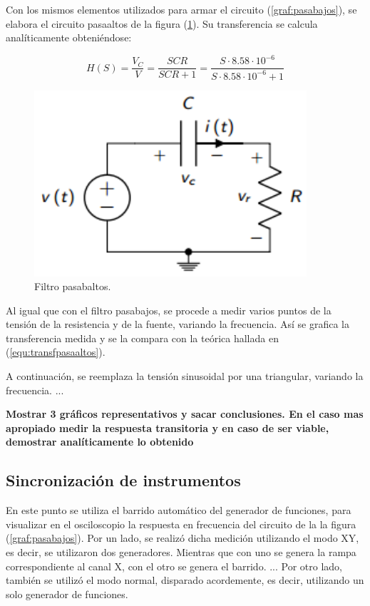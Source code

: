 \documentclass[a4paper]{article}
\begin{document}
Con los mismos elementos utilizados para armar el circuito (\ref{graf:pasabajos}), se elabora el circuito pasaaltos de la figura (\ref{graf:pasaaltos}). Su transferencia se calcula analíticamente obteniéndose:

\begin{equation}
	H \left(S \right) = \frac{V_C}{V} = \frac{SCR}{SCR + 1} = \frac{S \cdot 8.58 \cdot 10^{-6}}{S \cdot 8.58 \cdot 10^{-6} + 1}
	\label{equ:transfpasaaltos}
\end{equation}

\begin{figure}[H]
	\centering
	\includegraphics[width=0.9\textwidth]{Filtro-pasaaltos.PNG}
	\caption{Filtro pasabaltos.} 
	\label{graf:pasaaltos}
\end{figure}

Al igual que con el filtro pasabajos, se procede a medir varios puntos de la tensión de la resistencia y de la fuente, variando la frecuencia. Así se grafica la transferencia medida y se la compara con la teórica hallada en (\ref{equ:transfpasaaltos}).

A continuación, se reemplaza la tensión sinusoidal por una triangular, variando la frecuencia. ...

\textbf{Mostrar 3 gráficos representativos y sacar conclusiones. En el caso mas apropiado medir la respuesta transitoria y en caso de ser viable, demostrar analíticamente lo obtenido}

\subsection*{Sincronización de instrumentos}
En este punto se utiliza el barrido automático del generador de funciones, para visualizar en el osciloscopio la respuesta en frecuencia del circuito de la la figura (\ref{graf:pasabajos}). Por un lado, se realizó dicha medición utilizando el modo XY, es decir, se utilizaron dos generadores. Mientras que con uno se genera la rampa correspondiente al canal X, con el otro se genera el barrido. ...
Por otro lado, también se utilizó el modo normal, disparado acordemente, es decir, utilizando un solo generador de funciones.
\end{document}
